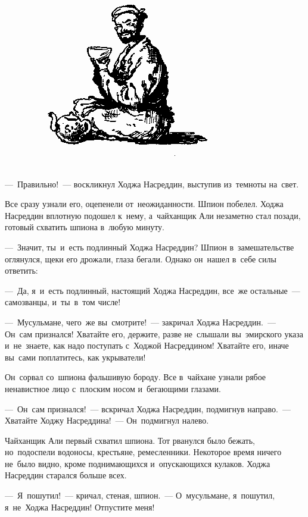 \documentclass[12pt,a4paper]{book}
\begin{document}
\begin{figure}[h]
\centering
\includegraphics[scale=0.9]{15.png}
\end{figure}

—~Правильно!~— воскликнул Ходжа Насреддин, выступив из~темноты на~свет.

Все сразу узнали его, оцепенели от~неожиданности. Шпион побелел. Ходжа Насреддин вплотную подошел к~нему, а~чайханщик Али незаметно стал позади, готовый схватить шпиона в~любую минуту.

—~Значит, ты~и~есть подлинный Ходжа Насреддин? Шпион в~замешательстве оглянулся, щеки его дрожали, глаза бегали. Однако он~нашел в~себе силы ответить:

—~Да, я~и~есть подлинный, настоящий Ходжа Насреддин, все~же остальные~— самозванцы, и~ты~в~том числе!

—~Мусульмане, чего~же вы~смотрите!~— закричал Ходжа Насреддин.~— Он~сам признался! Хватайте его, держите, разве не~слышали вы~эмирского указа и~не~знаете, как надо поступать с~Ходжой Насреддином! Хватайте его, иначе вы~сами поплатитесь, как укрыватели!

Он~сорвал со~шпиона фальшивую бороду. Все в~чайхане узнали рябое ненавистное лицо с~плоским носом и~бегающими глазами.

—~Он~сам признался!~— вскричал Ходжа Насреддин, подмигнув направо.~— Хватайте Ходжу Насреддина!~— Он~подмигнул налево.

Чайханщик Али первый схватил шпиона. Тот рванулся было бежать, но~подоспели водоносы, крестьяне, ремесленники. Некоторое время ничего не~было видно, кроме поднимающихся и~опускающихся кулаков. Ходжа Насреддин старался больше всех.

—~Я~пошутил!~— кричал, стеная, шпион.~— О~мусульмане, я~пошутил, я~не~Ходжа Насреддин! Отпустите меня!
\end{document}
